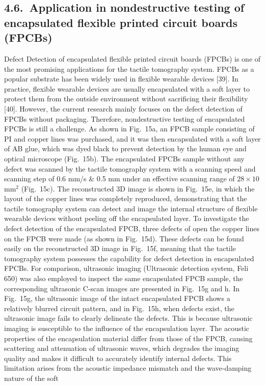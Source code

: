 \documentclass[11pt]{article}
\begin{document}
\subsection*{4.6.\ Application in nondestructive testing of encapsulated flexible printed circuit boards (FPCBs)}

Defect Detection of encapsulated flexible printed circuit boards
(FPCBs) is one of the most promising applications for the tactile
tomography system. FPCBs as a popular substrate has been widely
used in flexible wearable devices [39]. In practice, flexible
wearable devices are usually encapsulated with a soft layer to
protect them from the outside environment without sacrificing
their flexibility [40]. However, the current research mainly
focuses on the defect detection of FPCBs without packaging.
Therefore, nondestructive testing of encapsulated FPCBs is still a
challenge. As shown in Fig.~15a, an FPCB sample consisting of PI
and copper lines was purchased, and it was then encapsulated with
a soft layer of AB glue, which was dyed black to prevent detection
by the human eye and optical microscope (Fig.~15b). The
encapsulated FPCBs sample without any defect was scanned by the
tactile tomography system with a scanning speed and scanning step
of 0.6 mm/s \& 0.5 mm under an effective scanning range of $28
\times 10$ mm$^2$ (Fig.~15c). The reconstructed 3D image is shown
in Fig.~15e, in which the layout of the copper lines was
completely reproduced, demonstrating that the tactile tomography
system can detect and image the internal structure of flexible
wearable devices without peeling off the encapsulated layer. To
investigate the defect detection of the encapsulated FPCB, three
defects of open the copper lines on the FPCB were made (as shown
in Fig.~15d). These defects can be found easily on the
reconstructed 3D image in Fig.~15f, meaning that the tactile
tomography system possesses the capability for defect detection in
encapsulated FPCBs. For comparison, ultrasonic imaging (Ultrasonic
detection system, Feli 650) was also employed to inspect the same
encapsulated FPCB sample, the corresponding ultrasonic C-scan
images are presented in Fig.~15g and h. In Fig.~15g, the
ultrasonic image of the intact encapsulated FPCB shows a
relatively blurred circuit pattern, and in Fig.~15h, when defects
exist, the ultrasonic image fails to clearly delineate the defects.
This is because ultrasonic imaging is susceptible to the influence
of the encapsulation layer. The acoustic properties of the
encapsulation material differ from those of the FPCB, causing
scattering and attenuation of ultrasonic waves, which degrades the
imaging quality and makes it difficult to accurately identify
internal defects. This limitation arises from the acoustic
impedance mismatch and the wave-damping nature of the soft
\end{document}
